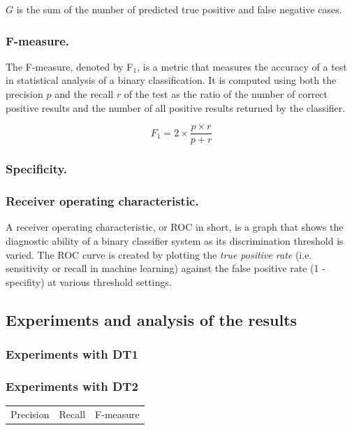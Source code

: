 $G$ is the sum of the number of predicted true positive and false negative cases.

\subsubsection{F-measure.} The F-measure, denoted by F$_1$, is a metric that measures the accuracy of a test in statistical analysis of a binary classification.
It is computed using both the precision $p$ and the recall $r$ of the test as the ratio of the number of correct positive results and the
number of all positive results returned by the classifier. 

\begin{equation}
F_1 = 2 \times \frac{p\times r}{p + r}
\label{f-measure}
\end{equation}
 
\subsubsection{Specificity.}
\subsubsection{Receiver operating characteristic.} A receiver operating characteristic, or ROC in short, is a graph
 that shows the diagnostic ability of a binary classifier system as its discrimination threshold is varied.
The ROC curve is created by plotting the \emph{true positive rate} (i.e. sensitivity or recall in machine learning) 
against the false positive rate (1 - specifity) at various threshold settings. 

\subsection{Experiments and analysis of the results}


\subsubsection{Experiments with DT1}
\subsubsection{Experiments with DT2}


\begin{table}[h]
\centering
\begin{tabular}{ccc}
Precision & Recall & F-measure\\
\end{tabular}
\end{table}

